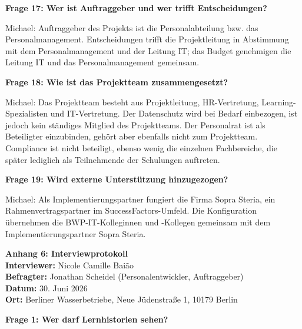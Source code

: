 \documentclass[
    12pt, 
    a4paper,
    ]{scrartcl} %
\begin{document}
\bigskip
{}

\textbf{Frage 17: Wer ist Auftraggeber und wer trifft Entscheidungen?}

Michael: Auftraggeber des Projekts ist die Personalabteilung bzw. das Personalmanagement. Entscheidungen trifft die Projektleitung in Abstimmung mit dem Personalmanagement und der Leitung IT; das Budget genehmigen die Leitung IT und das Personalmanagement gemeinsam.

\medskip
\textbf{Frage 18: Wie ist das Projektteam zusammengesetzt?}

Michael: Das Projektteam besteht aus Projektleitung, HR-Vertretung, Learning-Spezialisten und IT-Vertretung. Der Datenschutz wird bei Bedarf einbezogen, ist jedoch kein st\"andiges Mitglied des Projektteams. Der Personalrat ist als Beteiligter einzubinden, geh\"ort aber ebenfalls nicht zum Projektteam. Compliance ist nicht beteiligt, ebenso wenig die einzelnen Fachbereiche, die sp\"ater lediglich als Teilnehmende der Schulungen auftreten.

\medskip
\textbf{Frage 19: Wird externe Unterst\"utzung hinzugezogen?}

Michael: Als Implementierungspartner fungiert die Firma Sopra Steria, ein Rahmenvertragspartner im SuccessFactors-Umfeld. Die Konfiguration \"ubernehmen die BWP-IT-Kolleginnen und -Kollegen gemeinsam mit dem Implementierungspartner Sopra Steria.

\newpage
{}
{}
\label{sec:Anhang6}

{\Large\bfseries Anhang 6: Interviewprotokoll}\\[1em]
\textbf{Interviewer:} Nicole Camille Bai\~ao \\
\textbf{Befragter:} Jonathan Scheidel (Personalentwickler, Auftraggeber) \\
\textbf{Datum:} 30. Juni 2026 \\
\textbf{Ort:} Berliner Wasserbetriebe, Neue J\"udenstra{\ss}e 1, 10179 Berlin

\bigskip
{}

\bigskip
{}

\textbf{Frage 1: Wer darf Lernhistorien sehen?}
\end{document}
